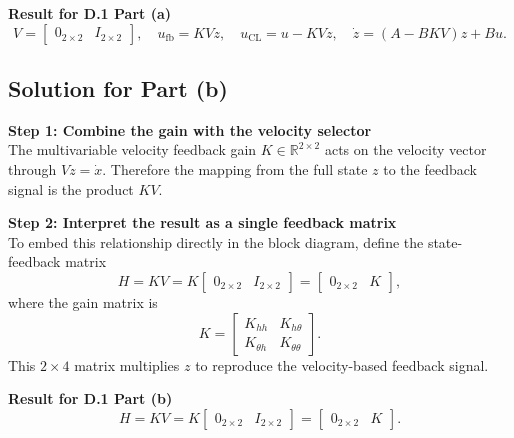 \documentclass[12pt]{article}
\begin{document}
\begin{resultsbox}
\textbf{Result for D.1 Part (a)}\\[0.5em]
\[
V = \begin{bmatrix} 0_{2\times2} & I_{2\times2} \end{bmatrix},\quad
u_{\text{fb}} = K V z,\quad
u_{\text{CL}} = u - K V z,\quad
\dot{z} = (A - B K V) z + B u.
\]
\end{resultsbox}

\subsection*{Solution for Part (b)}

\begin{stepbox}
\textbf{Step 1: Combine the gain with the velocity selector}\\[0.5em]
The multivariable velocity feedback gain $K \in \mathbb{R}^{2\times2}$ acts on the velocity vector through $V z = \dot{x}$.  Therefore the mapping from the full state $z$ to the feedback signal is the product $K V$.
\end{stepbox}

\begin{stepbox}
\textbf{Step 2: Interpret the result as a single feedback matrix}\\[0.5em]
To embed this relationship directly in the block diagram, define the state-feedback matrix
\[
H = K V = K \begin{bmatrix} 0_{2\times2} & I_{2\times2} \end{bmatrix}
       = \begin{bmatrix} 0_{2\times2} & K \end{bmatrix},
\]
where the gain matrix is
\[
K = \begin{bmatrix} K_{hh} & K_{h\theta} \\ K_{\theta h} & K_{\theta\theta} \end{bmatrix}.
\]
This $2\times4$ matrix multiplies $z$ to reproduce the velocity-based feedback signal.
\end{stepbox}

\begin{resultsbox}
\textbf{Result for D.1 Part (b)}\\[0.5em]
\[
H = K V = K \begin{bmatrix} 0_{2\times2} & I_{2\times2} \end{bmatrix}
        = \begin{bmatrix} 0_{2\times2} & K \end{bmatrix}.
\]
\end{resultsbox}
\end{document}
